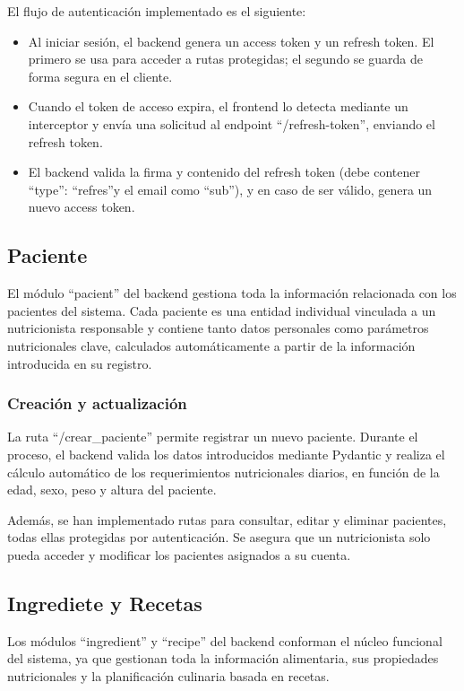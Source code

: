 \begin{enumerate}
    El flujo de autenticación implementado es el siguiente:
    \begin{itemize}
        \item Al iniciar sesión, el backend genera un access token y un refresh token. El primero se usa para acceder a rutas protegidas; el segundo se guarda de forma segura en el cliente.
        \item Cuando el token de acceso expira, el frontend lo detecta mediante un interceptor y envía una solicitud al endpoint ``/refresh-token'', enviando el refresh token.
        \item El backend valida la firma y contenido del refresh token (debe contener ``type'': ``refres''y el email como ``sub''), y en caso de ser válido, genera un nuevo access token.
    \end{itemize}
\end{enumerate}

\subsection{Paciente}
El módulo ``pacient'' del backend gestiona toda la información relacionada con los pacientes del sistema. Cada paciente es una entidad individual vinculada a un nutricionista responsable y contiene tanto datos personales como parámetros nutricionales clave, calculados automáticamente a partir de la información introducida en su registro.

\subsubsection*{Creación y actualización}
La ruta ``/crear\_paciente'' permite registrar un nuevo paciente. Durante el proceso, el backend valida los datos introducidos mediante Pydantic y realiza el cálculo automático de los requerimientos nutricionales diarios, en función de la edad, sexo, peso y altura del paciente.

Además, se han implementado rutas para consultar, editar y eliminar pacientes, todas ellas protegidas por autenticación. Se asegura que un nutricionista solo pueda acceder y modificar los pacientes asignados a su cuenta.

\subsection{Ingrediete y Recetas}
Los módulos ``ingredient'' y ``recipe'' del backend conforman el núcleo funcional del sistema, ya que gestionan toda la información alimentaria, sus propiedades nutricionales y la planificación culinaria basada en recetas.


